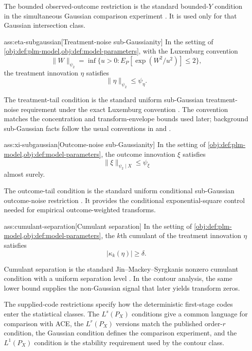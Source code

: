 \documentclass[11pt]{article}
\begin{document}
The bounded observed-outcome restriction is the standard bounded-\(Y\) condition in the simultaneous Gaussian comparison experiment \citep{JinMackeySyrgkanis2025}. It is used only for that Gaussian intersection class.

\begin{assumptionv}{ass:eta-subgaussian}[Treatment-noise sub-Gaussianity]
In the setting of \cref{obj:def:plm-model,obj:def:model-parameters}, with the Luxemburg convention
\[
\lVert W\rVert_{\psi_2}
=
\inf\{u>0:E_P[\exp(W^2/u^2)]\le2\},
\]
the treatment innovation \(\eta\) satisfies
\[
\lVert \eta\rVert_{\psi_2}\le\psi_{\eta}.
\]
\end{assumptionv}

The treatment-tail condition is the standard uniform sub-Gaussian treatment-noise requirement under the exact Luxemburg convention \citep{JinMackeySyrgkanis2025}. The convention matches the concentration and transform-envelope bounds used later; background sub-Gaussian facts follow the usual conventions in \citet{Vershynin2018} and \citet{Wainwright2019}.

\begin{assumptionv}{ass:xi-subgaussian}[Outcome-noise sub-Gaussianity]
In the setting of \cref{obj:def:plm-model,obj:def:model-parameters}, the outcome innovation \(\xi\) satisfies
\[
\lVert \xi\rVert_{\psi_2\mid X}\le\psi_{\xi}
\]
almost surely.
\end{assumptionv}

The outcome-tail condition is the standard uniform conditional sub-Gaussian outcome-noise restriction \citep{JinMackeySyrgkanis2025}. It provides the conditional exponential-square control needed for empirical outcome-weighted transforms.

\begin{assumptionv}{ass:cumulant-separation}[Cumulant separation]
In the setting of \cref{obj:def:plm-model,obj:def:model-parameters}, the \(k\)th cumulant of the treatment innovation \(\eta\) satisfies
\[
|\kappa_k(\eta)|\ge\delta.
\]
\end{assumptionv}

Cumulant separation is the standard Jin--Mackey--Syrgkanis nonzero cumulant condition with a uniform separation level \citep{JinMackeySyrgkanis2025}. In the contour analysis, the same lower bound supplies the non-Gaussian signal that later yields transform zeros.

The supplied-code restrictions specify how the deterministic first-stage codes enter the statistical classes. The \(L^s(P_X)\) conditions give a common language for comparison with ACE, the \(L^r(P_X)\) versions match the published order-\(r\) condition, the Gaussian condition defines the comparison experiment, and the \(L^1(P_X)\) condition is the stability requirement used by the contour class.
\end{document}
